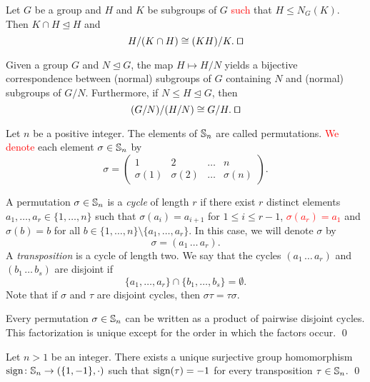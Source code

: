 \begin{theorem}
	Let $G$ be a group and $H$ and $K$ be subgroups of $G$ 
	\textcolor{red}{such} that $H\leq N_G(K)$. Then $K\cap H\unlhd H$ and
	\[
	H/(K\cap H)\cong (KH)/K.\;\qed
	\]
\end{theorem}

\begin{theorem} 
Given a group $G$ and $N\unlhd G$, 
the map $H\mapsto H/N$ yields 
a bijective correspondence between (normal) 
subgroups of $G$ containing $N$ and (normal) subgroups of $G/N$. 
Furthermore, if $N\leq H\unlhd G$, then
\[
(G/N)/(H/N)\cong G/H.\;\qed
\]
\end{theorem}

Let $n$ be a positive integer. The elements of $\mathbb{S}_n$ are called permutations. 
\textcolor{red}{We denote} each element $\sigma\in\mathbb{S}_n$ by
\[ 
\sigma=\left(\begin{array}{cccc}
1&2&\ldots&n\\
\sigma(1)&\sigma(2)&\ldots&\sigma(n)\end{array}\right).
\]


A permutation $\sigma\in \mathbb{S}_n$ is a {\em cycle} of length $r$ 
if there exist $r$ distinct elements 
$a_1,\dots ,a_r\in\{ 1,\dots, n\}$ such that $\sigma(a_i)=a_{i+1}$ for $1\leq i\leq r-1$, \textcolor{red}{$\sigma(a_r)=a_1$} and $\sigma(b)=b$ 
for all $b\in \{1,\dots, n\}\setminus\{ a_1,\dots ,a_r\}$. In this case, we will denote $\sigma$ by
\[ 
\sigma=(a_1\,\dots\, a_r).
\]
A {\em transposition} is a cycle of length two. 
We say that the cycles
$(a_1\,\dots\, a_r)$ and $(b_1\,\dots\, b_s)$ are disjoint if 
\[
\{ a_1,\dots, a_r\}\cap \{ b_1,\dots, b_s\}=\emptyset.
\]
Note that if $\sigma$ and $\tau$ are disjoint cycles, then $\sigma\tau=\tau\sigma$.

\begin{theorem}
        Every permutation $\sigma\in\mathbb{S}_n$ can be written as a product of pairwise disjoint cycles.
        This factorization is unique except for the order in which the factors occur. \qed
\end{theorem}

\begin{theorem}
    Let $n>1$ be an integer. There exists a unique surjective group homomorphism 
    \textcolor{red}{$\operatorname{sign}\colon \mathbb{S}_n\rightarrow (\{ 1,-1\} ,\cdot)$}
    such that $\operatorname{sign}(\tau)=-1$ for every transposition $\tau\in\mathbb{S}_n$. \qed
\end{theorem}



